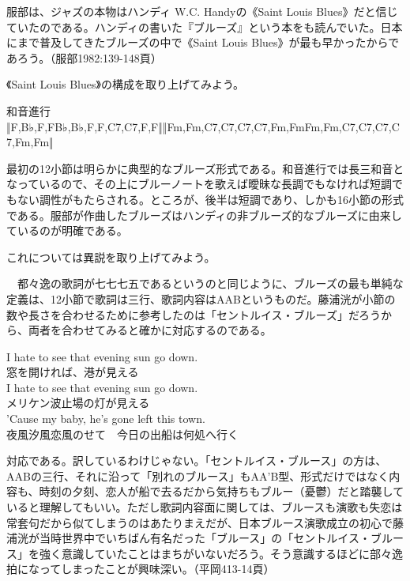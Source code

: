 服部は、ジャズの本物はハンディ W.C. Handyの《Saint Louis Blues》だと信じていたのである。ハンディの書いた『ブルーズ』という本をも読んでいた。日本にまで普及してきたブルーズの中で《Saint Louis Blues》が最も早かったからであろう。（服部1982:139-148頁）

《Saint Louis Blues》の構成を取り上げてみよう。

\begin{gquote}
和音進行‖F,B♭,F,FB♭,B♭,F,F,C7,C7,F,F‖‖Fm,Fm,C7,C7,C7,C7,Fm,FmFm,Fm,C7,C7,C7,C7,Fm,Fm‖
\end{gquote}

最初の12小節は明らかに典型的なブルーズ形式である。和音進行では長三和音となっているので、その上にブルーノートを歌えば曖昧な長調でもなければ短調でもない調性がもたらされる。ところが、後半は短調であり、しかも16小節の形式である。服部が作曲したブルーズはハンディの非ブルーズ的なブルーズに由来しているのが明確である。

これについては異説を取り上げてみよう。

\begin{gquote}
　都々逸の歌詞が七七七五であるというのと同じように、ブルーズの最も単純な定義は、12小節で歌詞は三行、歌詞内容はAABというものだ。藤浦洸が小節の数や長さを合わせるために参考したのは「セントルイス・ブルーズ」だろうから、両者を合わせてみると確かに対応するのである。
\end{gquote}

\begin{verseblock}
I hate to see that evening sun go down.\\
窓を開ければ、港が見える\\
I hate to see that evening sun go down.\\
メリケン波止場の灯が見える\\
'Cause my baby, he's gone left this town.\\
夜風汐風恋風のせて　今日の出船は何処へ行く
\end{verseblock}

\begin{gquote}
対応である。訳しているわけじゃない。「セントルイス・ブルース」の方は、AABの三行、それに沿って「別れのブルース」もAA'B型、形式だけではなく内容も、時刻の夕刻、恋人が船で去るだから気持ちもブルー（憂鬱）だと踏襲していると理解してもいい。ただし歌詞内容面に関しては、ブルースも演歌も失恋は常套句だから似てしまうのはあたりまえだが、日本ブルース演歌成立の初心で藤浦洸が当時世界中でいちばん有名だった「ブルース」の「セントルイス・ブルース」を強く意識していたことはまちがいないだろう。そう意識するほどに部々逸拍になってしまったことが興味深い。（平岡413-14頁）
\end{gquote}

